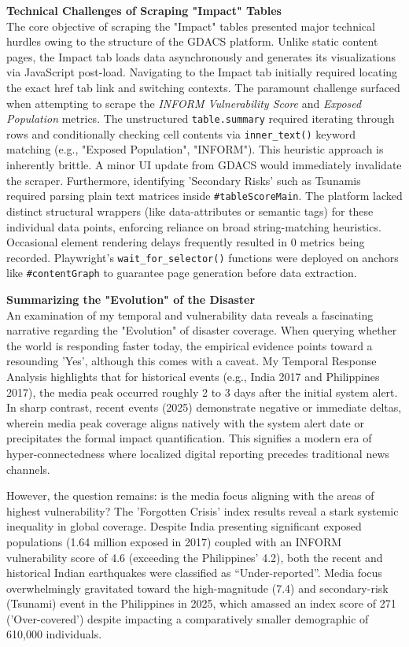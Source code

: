 \documentclass[11pt,a4paper]{article}
\begin{document}
\textbf{Technical Challenges of Scraping "Impact" Tables} \\
The core objective of scraping the "Impact" tables presented major technical hurdles owing to the structure of the GDACS platform. Unlike static content pages, the Impact tab loads data asynchronously and generates its visualizations via JavaScript post-load. Navigating to the Impact tab initially required locating the exact href tab link and switching contexts. 
The paramount challenge surfaced when attempting to scrape the \textit{INFORM Vulnerability Score} and \textit{Exposed Population} metrics. The unstructured \texttt{table.summary} required iterating through rows and conditionally checking cell contents via \texttt{inner\_text()} keyword matching (e.g., "Exposed Population", "INFORM"). This heuristic approach is inherently brittle. A minor UI update from GDACS would immediately invalidate the scraper. Furthermore, identifying 'Secondary Risks' such as Tsunamis required parsing plain text matrices inside \texttt{\#tableScoreMain}. The platform lacked distinct structural wrappers (like data-attributes or semantic tags) for these individual data points, enforcing reliance on broad string-matching heuristics. Occasional element rendering delays frequently resulted in 0 metrics being recorded. Playwright's \texttt{wait\_for\_selector()} functions were deployed on anchors like \texttt{\#contentGraph} to guarantee page generation before data extraction.

\textbf{Summarizing the "Evolution" of the Disaster} \\
An examination of my temporal and vulnerability data reveals a fascinating narrative regarding the "Evolution" of disaster coverage. When querying whether the world is responding faster today, the empirical evidence points toward a resounding 'Yes', although this comes with a caveat. My Temporal Response Analysis highlights that for historical events (e.g., India 2017 and Philippines 2017), the media peak occurred roughly 2 to 3 days after the initial system alert. In sharp contrast, recent events (2025) demonstrate negative or immediate deltas, wherein media peak coverage aligns natively with the system alert date or precipitates the formal impact quantification. This signifies a modern era of hyper-connectedness where localized digital reporting precedes traditional news channels.

However, the question remains: is the media focus aligning with the areas of highest vulnerability? The 'Forgotten Crisis' index results reveal a stark systemic inequality in global coverage. Despite India presenting significant exposed populations (1.64 million exposed in 2017) coupled with an INFORM vulnerability score of 4.6 (exceeding the Philippines’ 4.2), both the recent and historical Indian earthquakes were classified as “Under-reported”. Media focus overwhelmingly gravitated toward the high-magnitude (7.4) and secondary-risk (Tsunami) event in the Philippines in 2025, which amassed an index score of 271 ('Over-covered') despite impacting a comparatively smaller demographic of 610,000 individuals. 
\end{document}
